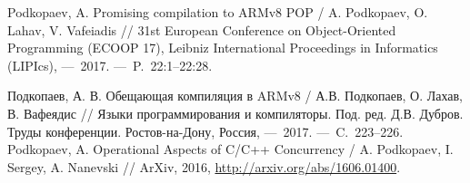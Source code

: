 \renewcommand{\refname}{Статьи в изданиях, входящих в базы цитирования Web of Science и SCOPUS}
\begin{thebibliography}{99}
\setcounter{enumiv}{\value{firstbib}}
 Podkopaev, A. Promising compilation to ARMv8 POP / A. Podkopaev, O. Lahav, V. Vafeiadis // 31st European Conference on Object-Oriented Programming (ECOOP 17), Leibniz International Proceedings in Informatics (LIPIcs),  ---~2017. ---~P.~22:1--22:28.
\setcounter{firstbib}{\value{enumiv}}
\end{thebibliography}

\renewcommand{\refname}{Статьи в других изданиях}
\begin{thebibliography}{99}
\setcounter{enumiv}{\value{firstbib}}
 Подкопаев, А. В. Обещающая компиляция в ARMv8 / А.В. Подкопаев, О. Лахав, В. Вафеядис // Языки программирования и компиляторы. Под. ред. Д.В. Дубров. Труды конференции. Ростов-на-Дону, Россия, ---~2017. ---~C.~223--226.
 Podkopaev, A. Operational Aspects of {C/C++} Concurrency / A. Podkopaev, I. Sergey, A. Nanevski // ArXiv, 2016, 
  \url{http://arxiv.org/abs/1606.01400}.
\end{thebibliography}
